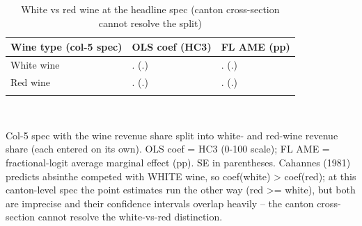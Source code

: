 \begin{table}[tbp] \centering
{}

\caption{White vs red wine at the headline spec (canton cross-section cannot resolve the split)}
\label{tab:T_winetype}
\begin{tabularx}{\linewidth}{@{}lCC@{}}

\toprule
{Wine type (col-5 spec)}&{OLS coef (HC3)}&{FL AME (pp)} \tabularnewline
\midrule \addlinespace[\belowrulesep]
White wine&. (.)&. (.) \tabularnewline
Red wine&. (.)&. (.) \tabularnewline
\bottomrule \addlinespace[\belowrulesep]

\end{tabularx}
\\ \parbox{\linewidth}{\footnotesize Col-5 spec with the wine revenue share split into white- and red-wine revenue share (each entered on its own). OLS coef = HC3 (0-100 scale); FL AME = fractional-logit average marginal effect (pp). SE in parentheses. Cahannes (1981) predicts absinthe competed with WHITE wine, so coef(white) > coef(red); at this canton-level spec the point estimates run the other way (red >= white), but both are imprecise and their confidence intervals overlap heavily -- the canton cross-section cannot resolve the white-vs-red distinction.}
\end{table}
